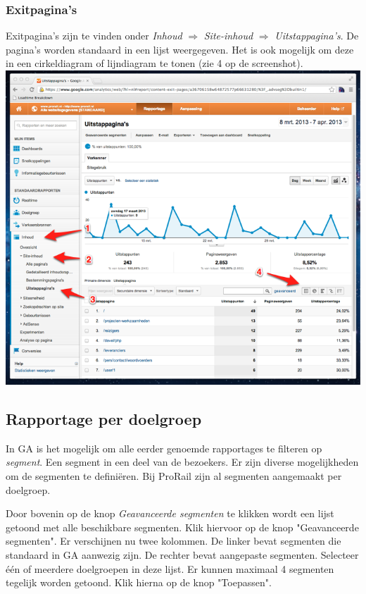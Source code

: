 \clearpage
\subsubsection{Exitpagina's}
Exitpagina's zijn te vinden onder \emph{Inhoud} $\Rightarrow$ \emph{Site-inhoud} $\Rightarrow$ \emph{Uitstappagina's}. De pagina's worden standaard in een lijst weergegeven. Het is ook mogelijk om deze in een cirkeldiagram of lijndiagram te tonen (zie 4 op de screenshot).
\\

\includegraphics[width=\textwidth]{img/stats5.png}

\clearpage
\subsection{Rapportage per doelgroep}
In GA is het mogelijk om alle eerder genoemde rapportages te filteren op \emph{segment}. Een segment in een deel van de bezoekers. Er zijn diverse mogelijkheden om de segmenten te defini\"{e}ren. Bij ProRail zijn al segmenten aangemaakt per doelgroep.

Door bovenin op de knop \emph{Geavanceerde segmenten} te klikken wordt een lijst getoond met alle beschikbare segmenten. Klik hiervoor op de knop "Geavanceerde segmenten". Er verschijnen nu twee kolommen. De linker bevat segmenten die standaard in GA aanwezig zijn. De rechter bevat aangepaste segmenten. Selecteer \'{e}\'{e}n of meerdere doelgroepen in deze lijst. Er kunnen maximaal 4 segmenten tegelijk worden getoond. Klik hierna op de knop "Toepassen".

